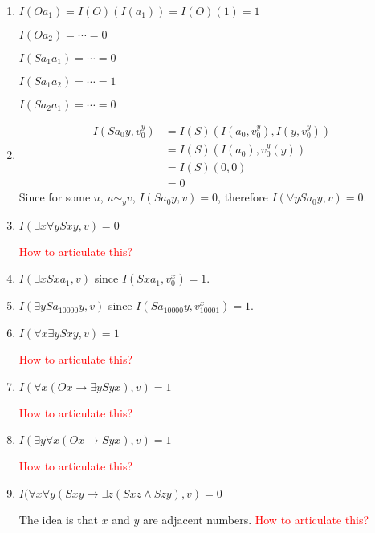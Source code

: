 \begin{enumerate}[label=(\roman*)]
\item
$I(Oa_1) = I(O)(I(a_1)) = I(O)(1) = 1$

$I(Oa_2) = \cdots = 0$

$I(Sa_1a_1) = \cdots = 0$

$I(Sa_1a_2) = \cdots = 1$

$ I(Sa_2a_1) = \cdots = 0$

\item
\begin{equation} \label{eq:5}
\begin{split}
I(Sa_0y,v^y_0) &= I(S)(I(a_0,v^y_0),I(y,v^y_0)) \\
&= I(S)(I(a_0),v^y_0(y)) \\
&= I(S)(0,0) \\
&= 0
\end{split}
\end{equation}
Since for some $u$, $u \sim_y v$, $I(Sa_0y, v) = 0$, therefore $I(\forall y Sa_0y, v) = 0$.

\item
$I(\exists x \forall y Sxy, v) = 0$

\textcolor{red}{How to articulate this?}

\item
$I(\exists x Sxa_1, v)$ since $I(Sxa_1, v^x_0) = 1$.

\item
$I(\exists y Sa_{10000}y, v)$ since $I(Sa_{10000}y, v^x_{10001}) = 1$.

\item
$I(\forall x \exists y Sxy, v) = 1$

\textcolor{red}{How to articulate this?}

\item
$I(\forall x (Ox \to \exists y Syx), v) = 1$

\textcolor{red}{How to articulate this?}

\item
$I(\exists y \forall x (Ox \to Syx), v) = 1$

\textcolor{red}{How to articulate this?}

\item
$I(\forall x \forall y (Sxy \to \exists z (Sxz \land Szy), v) = 0$

The idea is that $x$ and $y$ are adjacent numbers.
\textcolor{red}{How to articulate this?}

\end{enumerate}